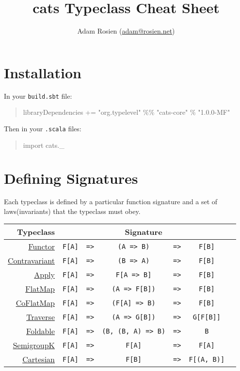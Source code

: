 \documentclass{tufte-handout}
\title{cats Typeclass Cheat Sheet}
\author[Adam Rosien]{Adam Rosien (\href{mailto:adam@rosien.net}{adam@rosien.net})}
\newcommand{\fa}{F[A]}
\newcommand{\fb}{F[B]}
\newcommand{\rarr}{\texttt{=>}}
\newcommand{\fThree}[3]{\texttt{#1} & \rarr & \texttt{#2} & \rarr & \texttt{#3}}
\newcommand{\sdocUrl}[1]{https://typelevel.org/cats/api/cats/#1.html}
\newcommand{\sdocHref}[1]{\href{\sdocUrl{#1}}{#1}}
\begin{document}
\maketitle%

\section{Installation}\label{sec:installation}

\noindent In your \texttt{build.sbt} file:

\begin{quote}
  \ttfamily libraryDependencies += "org.typelevel" \%\% "cats-core" \% "1.0.0-MF"
\end{quote}

\noindent Then in your \texttt{.scala} files:

\begin{quote}
  \ttfamily import cats.\_
\end{quote}

\section{Defining Signatures}

Each typeclass is defined by a particular function signature and a set of laws\footnotemark (invariants) that the typeclass must obey.


\begin{table}[ht]
  \centering
  \selectfont
  \setlength{\tabcolsep}{5pt}
  \begin{tabular}{rcrcccl}
    Typeclass & \multicolumn{5}{c}{Signature} \\
    \midrule
    \sdocHref{Functor}               & \fThree{\fa}{(A => B)}{\fb} \\
    \sdocHref{Contravariant}         & \fThree{\fa}{(B => A)}{\fb} \\
    \sdocHref{Apply}\footnotemark    & \fThree{\fa}{F[A => B]}{\fb} \\
    \sdocHref{FlatMap}\footnotemark  & \fThree{\fa}{(A => F[B])}{\fb} \\
    \sdocHref{CoFlatMap}             & \fThree{\fa}{(F[A] => B)}{\fb} \\
    \sdocHref{Traverse}\footnotemark & \fThree{\fa}{(A => G[B])}{G[F[B]]} \\
    \sdocHref{Foldable}              & \fThree{\fa}{(B, (B, A) => B)}{B} \\
    \sdocHref{SemigroupK}               & \fThree{\fa}{\fa}{\fa} \\
    \sdocHref{Cartesian}             & \fThree{\fa}{\fb}{F[(A, B)]} \\
  \end{tabular}
  \label{tab:normaltab}
\end{table}
\end{document}
